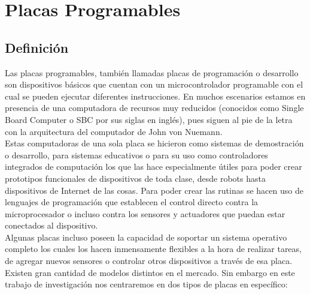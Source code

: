 

\chapter{Placas Programables}

\section{Definición}
Las placas programables, también llamadas placas de programación o desarrollo son dispositivos básicos que cuentan con un microcontrolador programable con el cual se pueden ejecutar diferentes instrucciones. En muchos escenarios estamos en presencia de una computadora de recursos muy reducidos (conocidos como Single Board Computer o SBC por sus siglas en inglés), pues siguen al pie de la letra con la arquitectura del computador de John von Nuemann\cite{arquitecturaComputador}.\\ 

Estas computadoras de una sola placa se hicieron como sistemas de demostración o desarrollo, para sistemas educativos o para su uso como controladores integrados de computación los que las hace especialmente útiles para poder crear prototipos funcionales de dispositivos de toda clase, desde robots hasta dispositivos de Internet de las cosas. Para poder crear las rutinas se hacen uso de lenguajes de programación que establecen el control directo contra la microprocesador o incluso contra los sensores y actuadores que puedan estar conectados al dispositivo.\\

Algunas placas incluso poseen la capacidad de soportar un sistema operativo completo los cuales los hacen inmensamente flexibles a la hora de realizar tareas, de agregar nuevos sensores o controlar otros dispositivos a través de esa placa. Existen gran cantidad de modelos distintos en el mercado. Sin embargo en este trabajo de investigación nos centraremos en dos tipos de placas en específico:

